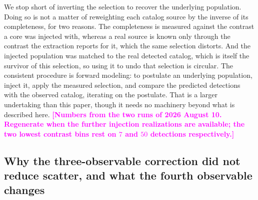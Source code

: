 \documentclass{aa}
\newcommand{\draftnote}[1]{\textcolor{magenta}{\textbf{[#1]}}}
\begin{document}
We stop short of inverting the selection to recover the underlying
population. Doing so is not a matter of reweighting each catalog source by the
inverse of its completeness, for two reasons. The completeness is measured
against the contrast a core was injected with, whereas a real source is known
only through the contrast the extraction reports for it, which the same
selection distorts. And the injected population was matched to the real
detected catalog, which is itself the survivor of this selection, so
using it to undo that selection is circular. The consistent procedure is
forward modeling: to postulate an underlying population, inject it, apply the
measured selection, and compare the predicted detections with the observed
catalog, iterating on the postulate. That is a larger undertaking than this
paper, though it needs no machinery beyond what is described here.
\draftnote{Numbers from the two runs of 2026 August 10. Regenerate when the
further injection realizations are available; the two lowest contrast bins
rest on $7$ and $50$ detections respectively.}


\subsection{Why the three-observable correction did not reduce scatter,
and what the fourth observable changes}
\label{sec:scatterfloor}
\end{document}
